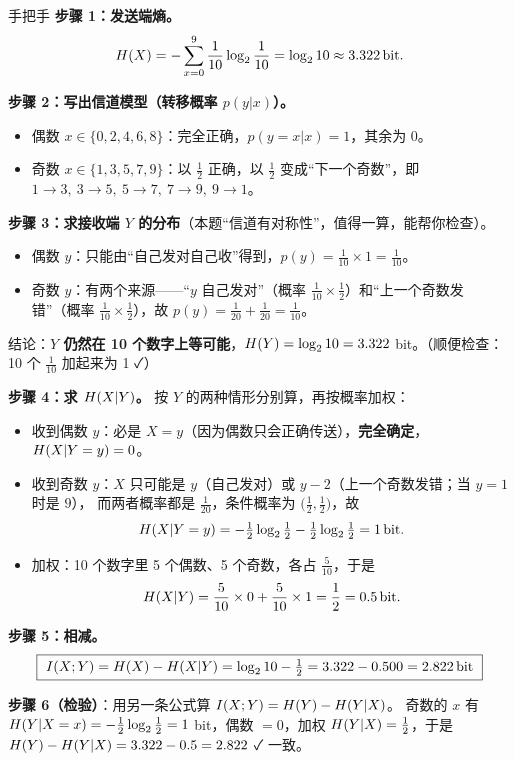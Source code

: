 \documentclass[11pt,a4paper]{ctexart}
\begin{document}
\begin{calc}{手把手}
\textbf{步骤 1：发送端熵。}
\[
H\!\left(X\right)=-\sum_{x=0}^{9}\frac1{10}\log_{2}\frac1{10}=\log_{2}10\approx3.322\,\text{bit} .
\]

\textbf{步骤 2：写出信道模型（转移概率 $p(y|x)$）。}
\begin{itemize}[leftmargin=1.6em,itemsep=1pt,topsep=1pt]
  \item 偶数 $x\in\{0,2,4,6,8\}$：完全正确，$p(y=x|x)=1$，其余为 $0$。
  \item 奇数 $x\in\{1,3,5,7,9\}$：以 $\frac12$ 正确，以 $\frac12$ 变成“下一个奇数”，即
        $1\to3,\ 3\to5,\ 5\to7,\ 7\to9,\ 9\to1$。
\end{itemize}

\textbf{步骤 3：求接收端 $Y$ 的分布}（本题“信道有对称性”，值得一算，能帮你检查）。
\begin{itemize}[leftmargin=1.6em,itemsep=1pt,topsep=1pt]
  \item 偶数 $y$：只能由“自己发对自己收”得到，$p(y)=\frac1{10}\times1=\frac1{10}$。
  \item 奇数 $y$：有两个来源——“$y$ 自己发对”（概率 $\frac1{10}\times\frac12$）和“上一个奇数发错”（概率 $\frac1{10}\times\frac12$），故
        $p(y)=\frac1{20}+\frac1{20}=\frac1{10}$。
\end{itemize}
结论：\textbf{$Y$ 仍然在 10 个数字上等可能}，$H\!\left(Y\right)=\log_{2}10=3.322$ bit。（顺便检查：10 个 $\frac1{10}$ 加起来为 1 ✓）

\textbf{步骤 4：求 $H\!\left(X|Y\right)$。} 按 $Y$ 的两种情形分别算，再按概率加权：
\begin{itemize}[leftmargin=1.6em,itemsep=1pt,topsep=1pt]
  \item 收到偶数 $y$：必是 $X=y$（因为偶数只会正确传送），\textbf{完全确定}，$H\!\left(X|Y=y\right)=0$。
  \item 收到奇数 $y$：$X$ 只可能是 $y$（自己发对）或 $y-2$（上一个奇数发错；当 $y=1$ 时是 $9$），
        而两者概率都是 $\frac1{20}$，条件概率为 $\bigl(\frac12,\frac12\bigr)$，故
        \[
        H\!\left(X|Y=y\right)=-\tfrac12\log_{2}\tfrac12-\tfrac12\log_{2}\tfrac12=1\,\text{bit} .
        \]
  \item 加权：10 个数字里 5 个偶数、5 个奇数，各占 $\frac{5}{10}$，于是
        \[
        H\!\left(X|Y\right)=\frac{5}{10}\times0+\frac{5}{10}\times1=\frac12=0.5\,\text{bit} .
        \]
\end{itemize}

\textbf{步骤 5：相减。}
\[
\boxed{\ \I{X;Y}=\Hx{X}-\Hx{X|Y}=\lb10-\tfrac12=3.322-0.500=2.822\bit\ }
\]

\textbf{步骤 6（检验）}：用另一条公式算 $I\!\left(X;Y\right)=H\!\left(Y\right)-H\!\left(Y|X\right)$。
奇数的 $x$ 有 $H\!\left(Y|X=x\right)=-\frac12\log_{2}\frac12=1$ bit，偶数 $=0$，加权 $H\!\left(Y|X\right)=\frac12$，于是
$H\!\left(Y\right)-H\!\left(Y|X\right)=3.322-0.5=2.822$ ✓ 一致。
\end{calc}
\end{document}
